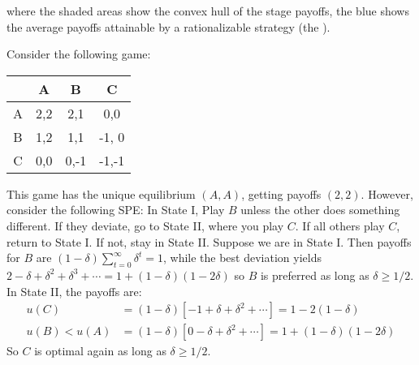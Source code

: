 \documentclass[10pt]{article}
\begin{document}
\begin{example}
\begin{remark}
\begin{figure}[H]
\begin{tikzpicture}[scale=0.5]
			\end{tikzpicture}
		\end{figure}
		where the shaded areas show the convex hull of the stage payoffs, the blue shows the average payoffs attainable by a rationalizable strategy (the ).
	\end{remark}
\end{example}



\begin{example}
	 Consider the following game:
	\begin{center}
		\begin{tabular}{c|ccc}
			& A & B & C \\\hline 
			A & 2,2 & 2,1 & 0,0 \\
			B & 1,2 & 1,1& -1, 0 \\
			C & 0,0 & 0,-1 & -1,-1
		\end{tabular}
	\end{center}
	This game has the unique equilibrium $(A,A)$, getting payoffs $(2,2)$. However, consider the following SPE: In State I, Play $B$ unless the other does something different. If they deviate, go to State II, where you play $C$. If all others play $C$, return to State I. If not, stay in State II. Suppose we are in State I. Then payoffs for $B$ are $(1-\delta) \sum_{t=0}^\infty \delta^t = 1$, while the best deviation yields $2 - \delta + \delta^2 + \delta^3 + \cdots = 1 + (1-\delta)(1-2\delta)$ so $B$ is preferred as long as  $\delta \ge 1/2$. In State II, the payoffs are:
	\begin{align*}
		u(C) &= (1-\delta) [-1 + \delta + \delta^2 + \cdots] = 1 - 2(1-\delta) \\u(B) < u(A) &= (1-\delta) [0 - \delta + \delta^2 + \cdots] = 1 + (1-\delta)(1-2\delta)
	\end{align*}
	So $C$ is optimal again as long as $\delta \ge 1/2$. 
\end{example}
\end{document}
